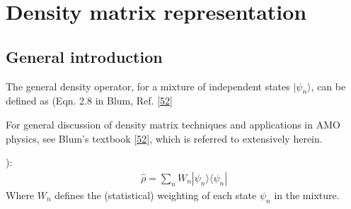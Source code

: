 \documentclass[letterpaper,table,10pt,english]{jupyterBook}
\begin{document}
\section{Density matrix representation}
\label{\detokenize{part1/theory_density_matrices_310123:density-matrix-representation}}\label{\detokenize{part1/theory_density_matrices_310123:sec-density-mat-basic}}\label{\detokenize{part1/theory_density_matrices_310123::doc}}

\subsection{General introduction}
\label{\detokenize{part1/theory_density_matrices_310123:general-introduction}}\label{\detokenize{part1/theory_density_matrices_310123:sec-density-mat-intro}}
\sphinxAtStartPar
The general density operator, for a mixture of independent states \(|\psi_{n} \rangle\), can be defined as (Eqn. 2.8 in Blum, Ref. {[}\hyperlink{cite.backmatter/bibliography:id444}{52}{]} \sphinxstepexplicit %
\begin{footnote}[1]\label{\thesphinxscope.1}%
\sphinxAtStartFootnote
For general discussion of density matrix techniques and applications in AMO physics, see Blum’s textbook  {[}\hyperlink{cite.backmatter/bibliography:id444}{52}{]}, which is referred to extensively herein.
%
\end{footnote}):
\begin{equation*}
\begin{split}
\hat{\rho}=\sum_{n}W_{n}|\psi_{n}\rangle\langle\psi_{n}|
\end{split}
\end{equation*}
\sphinxAtStartPar
Where \(W_{n}\) defines the (statistical) weighting of each state \(\psi_{n}\) in the mixture.
\end{document}
